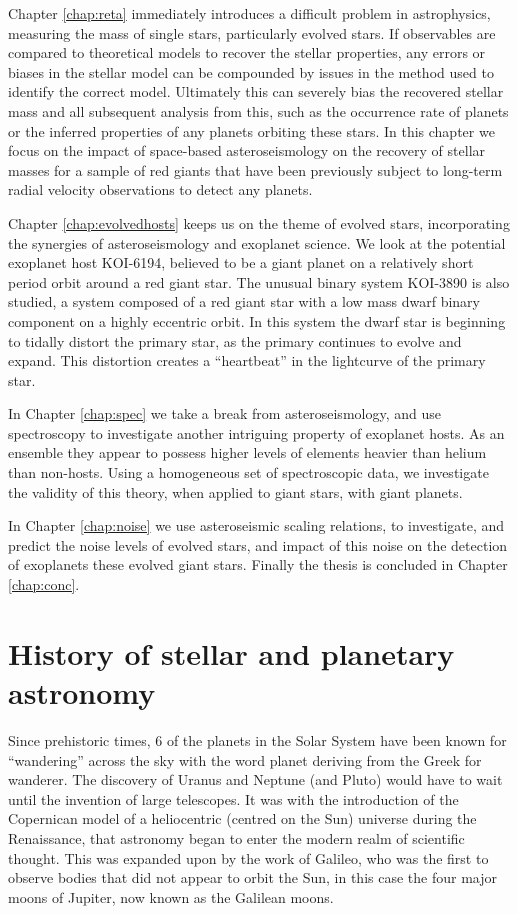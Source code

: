 Chapter \ref{chap:reta} immediately introduces a difficult problem in astrophysics, measuring the mass of single stars, particularly evolved stars. If observables are compared to theoretical models to recover the stellar properties, any errors or biases in the stellar model can be compounded by issues in the method used to identify the correct model. Ultimately this can severely bias the recovered stellar mass and all subsequent analysis from this, such as the occurrence rate of planets or the inferred properties of any planets orbiting these stars. In this chapter we focus on the impact of space-based asteroseismology on the recovery of stellar masses for a sample of red giants that have been previously subject to long-term radial velocity observations to detect any planets. 

Chapter \ref{chap:evolvedhosts} keeps us on the theme of evolved stars, incorporating the synergies of asteroseismology and exoplanet science. We look at the potential exoplanet host KOI-6194, believed to be a giant planet on a relatively short period orbit around a red giant star. The unusual binary system KOI-3890 is also studied, a system composed of a red giant star with a low mass dwarf binary component on a highly eccentric orbit. In this system the dwarf star is beginning to tidally distort the primary star, as the primary continues to evolve and expand. This distortion creates a ``heartbeat'' in the lightcurve of the primary star.

In Chapter \ref{chap:spec} we take a break from asteroseismology, and use spectroscopy to investigate another intriguing property of exoplanet hosts. As an ensemble they appear to possess higher levels of elements heavier than helium than non-hosts. Using a homogeneous set of spectroscopic data, we investigate the validity of this theory, when applied to giant stars, with giant planets. 

In Chapter \ref{chap:noise} we use asteroseismic scaling relations, to investigate, and predict the noise levels of evolved stars, and impact of this noise on the detection of exoplanets these evolved giant stars.
Finally the thesis is concluded in Chapter \ref{chap:conc}.


\section{History of stellar and planetary astronomy}
Since prehistoric times, 6 of the planets in the Solar System have been known for ``wandering'' across the sky \ndash with the word planet deriving from the Greek for wanderer. The discovery of Uranus and Neptune (and Pluto) would have to wait until the invention of large telescopes. It was with the introduction of the Copernican model of a heliocentric (centred on the Sun) universe during the Renaissance, that astronomy began to enter the modern realm of scientific thought. This was expanded upon by the work of Galileo, who was the first to observe bodies that did not appear to orbit the Sun, in this case the four major moons of Jupiter, now known as the Galilean moons. 

